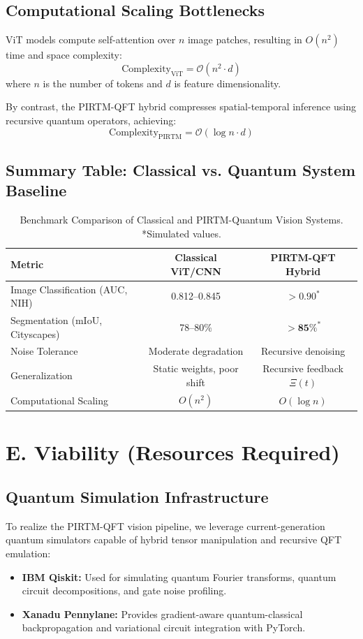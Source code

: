\documentclass[12pt]{article}
\theoremstyle{plain}
\begin{document}
\subsection*{Computational Scaling Bottlenecks}

ViT models compute self-attention over $n$ image patches, resulting in $O(n^2)$ time and space complexity:
\[
\text{Complexity}_{\text{ViT}} = \mathcal{O}(n^2 \cdot d)
\]
where $n$ is the number of tokens and $d$ is feature dimensionality.

By contrast, the PIRTM-QFT hybrid compresses spatial-temporal inference using recursive quantum operators, achieving:
\[
\text{Complexity}_{\text{PIRTM}} = \mathcal{O}(\log n \cdot d)
\]

\subsection*{Summary Table: Classical vs. Quantum System Baseline}

\begin{table}[h!]
\centering
\begin{tabular}{|l|c|c|}
\hline
\textbf{Metric} & \textbf{Classical ViT/CNN} & \textbf{PIRTM-QFT Hybrid} \\
\hline
Image Classification (AUC, NIH) & 0.812–0.845 & $\mathbf{> 0.90^*}$ \\
\hline
Segmentation (mIoU, Cityscapes) & 78–80\% & $\mathbf{> 85\%^*}$ \\
\hline
Noise Tolerance & Moderate degradation & Recursive denoising \\
\hline
Generalization & Static weights, poor shift & Recursive feedback $\Xi(t)$ \\
\hline
Computational Scaling & $O(n^2)$ & $O(\log n)$ \\
\hline
\end{tabular}
\caption{Benchmark Comparison of Classical and PIRTM-Quantum Vision Systems. *Simulated values.}
\end{table}

\section*{E. Viability (Resources Required)}

\subsection*{Quantum Simulation Infrastructure}

To realize the PIRTM-QFT vision pipeline, we leverage current-generation quantum simulators capable of hybrid tensor manipulation and recursive QFT emulation:
\begin{itemize}
    \item \textbf{IBM Qiskit:} Used for simulating quantum Fourier transforms, quantum circuit decompositions, and gate noise profiling.
    \item \textbf{Xanadu Pennylane:} Provides gradient-aware quantum-classical backpropagation and variational circuit integration with PyTorch.
\end{itemize}
\end{document}
